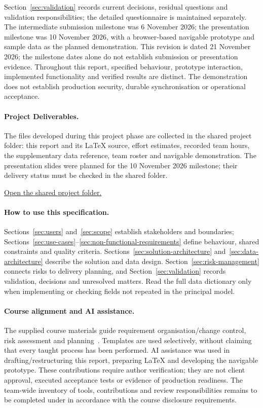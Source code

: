 Section~\ref{sec:validation} records current decisions, residual questions and
validation responsibilities; the detailed questionnaire is maintained separately.
The intermediate submission milestone was 6 November 2026; the presentation
milestone was 10 November 2026, with a browser-based navigable prototype and sample
data as the planned demonstration. This revision is dated 21 November 2026;
the milestone dates alone do not establish submission or presentation evidence.
Throughout this report, specified behaviour, prototype interaction, implemented
functionality and verified results are distinct. The demonstration does not
establish production security, durable synchronisation or operational acceptance.

\paragraph{Project Deliverables.}
The files developed during this project phase are collected in the shared project
folder: this report and its LaTeX source, effort estimates, recorded team hours,
the supplementary data reference, team roster and navigable demonstration.
The presentation slides were planned for the 10 November 2026 milestone;
their delivery status must be checked in the shared folder.
\par\href{https://drive.google.com/drive/folders/1rIQ5pGJDSKda0syKZ2MtbdDA0DTqOnRW?usp=sharing}{Open the shared project folder.}

\paragraph{How to use this specification.}
Sections~\ref{sec:users} and~\ref{sec:scope} establish stakeholders and boundaries;
Sections~\ref{sec:use-cases}--\ref{sec:non-functional-requirements} define behaviour,
shared constraints and quality criteria. Sections~\ref{sec:solution-architecture}
and~\ref{sec:data-architecture} describe the solution and data design.
Section~\ref{sec:risk-management} connects risks to delivery planning, and
Section~\ref{sec:validation} records validation, decisions and unresolved matters. Read the full data dictionary only when
implementing or checking fields not repeated in the principal model.

\paragraph{Course alignment and AI assistance.}
The supplied course materials guide requirement organisation/change control,
risk assessment and planning~\cite{course-presentation,course-concepts,course-scope,course-estimation,course-risk,course-planning,course-customer}. Templates are used
selectively, without claiming that every taught process has been performed.
AI assistance was used in drafting/restructuring this report, preparing LaTeX
and developing the navigable prototype. These contributions require author
verification; they are not client approval, executed acceptance tests or evidence
of production readiness. The team-wide inventory of tools, contributions and
review responsibilities remains to be completed under 
in accordance with the course disclosure requirements.

